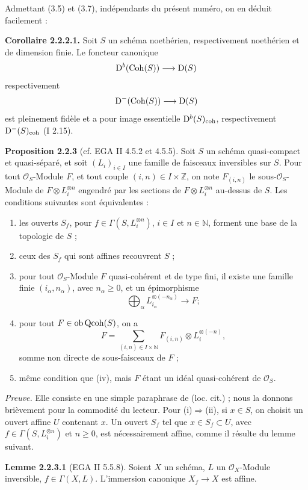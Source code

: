 \documentclass[11pt]{article}
\begin{document}
Admettant (3.5) et (3.7), indépendants du présent numéro, on en déduit facilement :

\textbf{Corollaire 2.2.2.1.} Soit $S$ un schéma noethérien, respectivement noethérien et de dimension finie. Le foncteur canonique
\[
\mathrm D^b(\operatorname{Coh}(S))\longrightarrow\mathrm D(S)
\]
respectivement
\[
\mathrm D^{-}(\operatorname{Coh}(S))\longrightarrow\mathrm D(S)
\]
est pleinement fidèle et a pour image essentielle $\mathrm D^b(S)_{\operatorname{coh}}$, respectivement $\mathrm D^{-}(S)_{\operatorname{coh}}$ (I 2.15).

\textbf{Proposition 2.2.3} (cf. EGA II 4.5.2 et 4.5.5). Soit $S$ un schéma quasi-compact et quasi-séparé, et soit $(L_i)_{i\in I}$ une famille de faisceaux inversibles sur $S$. Pour tout $\mathcal O_S$-Module $F$, et tout couple $(i,n)\in I\times\mathbb Z$, on note $F_{(i,n)}$ le sous-$\mathcal O_S$-Module de $F\otimes L_i^{\otimes n}$ engendré par les sections de $F\otimes L_i^{\otimes n}$ au-dessus de $S$. Les conditions suivantes sont équivalentes :
\begin{enumerate}[label=(\roman*)]
\item les ouverts $S_f$, pour $f\in\Gamma(S,L_i^{\otimes n})$, $i\in I$ et $n\in\mathbb N$, forment une base de la topologie de $S$ ;
\item ceux des $S_f$ qui sont affines recouvrent $S$ ;
\item pour tout $\mathcal O_S$-Module $F$ quasi-cohérent et de type fini, il existe une famille finie $(i_\alpha,n_\alpha)$, avec $n_\alpha\ge0$, et un épimorphisme
\[
\bigoplus_\alpha L_{i_\alpha}^{\otimes(-n_\alpha)}\longrightarrow F ;
\]
\item pour tout $F\in\operatorname{ob}\operatorname{Qcoh}(S)$, on a
\[
F=\sum_{(i,n)\in I\times\mathbb N}F_{(i,n)}\otimes L_i^{\otimes(-n)},
\]
somme non directe de sous-faisceaux de $F$ ;
\item même condition que (iv), mais $F$ étant un idéal quasi-cohérent de $\mathcal O_S$.
\end{enumerate}

\emph{Preuve.} Elle consiste en une simple paraphrase de (loc. cit.) ; nous la donnons brièvement pour la commodité du lecteur. Pour (i)$\Rightarrow$(ii), si $x\in S$, on choisit un ouvert affine $U$ contenant $x$. Un ouvert $S_f$ tel que $x\in S_f\subset U$, avec $f\in\Gamma(S,L_i^{\otimes n})$ et $n\ge0$, est nécessairement affine, comme il résulte du lemme suivant.

\textbf{Lemme 2.2.3.1} (EGA II 5.5.8). Soient $X$ un schéma, $L$ un $\mathcal O_X$-Module inversible, $f\in\Gamma(X,L)$. L'immersion canonique $X_f\to X$ est affine.
\end{document}
